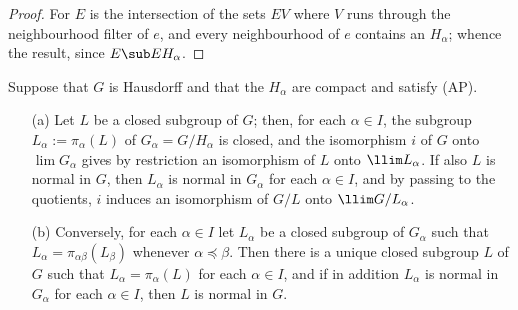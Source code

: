 \begin{proof}
For $E$ is the intersection of the sets $EV$ where $V$ runs through the neighbourhood filter of $e$, and every neighbourhood of $e$ contains an $H_\alpha$; whence the result, since $E\sub EH_\alpha$.
\end{proof}
\begin{proposition}\label{topological group inverse limit of compact quotient prop}
Suppose that $G$ is Hausdorff and that the $H_\alpha$ are compact and satisfy (AP).
\begin{itemize}
\item[(a)] Let $L$ be a closed subgroup of $G$; then, for each $\alpha\in I$, the subgroup $L_\alpha:=\pi_\alpha(L)$ of $G_\alpha=G/H_\alpha$ is closed, and the isomorphism $i$ of $G$ onto $\lim G_\alpha$ gives by restriction an isomorphism of $L$ onto $\llim L_\alpha$. If also $L$ is normal in $G$, then $L_\alpha$ is normal in $G_\alpha$ for each $\alpha\in I$, and by passing to the quotients, $i$ induces an isomorphism of $G/L$ onto $\llim G/L_\alpha$.
\item[(b)] Conversely, for each $\alpha\in I$ let $L_\alpha$ be a closed subgroup of $G_\alpha$ such that $L_\alpha=\pi_{\alpha\beta}(L_\beta)$ whenever $\alpha\preceq\beta$. Then there is a unique closed subgroup $L$ of $G$ such that $L_\alpha=\pi_\alpha(L)$ for each $\alpha\in I$, and if in addition $L_\alpha$ is normal in $G_\alpha$ for each $\alpha\in I$, then $L$ is normal in $G$. 
\end{itemize}
\end{proposition}
